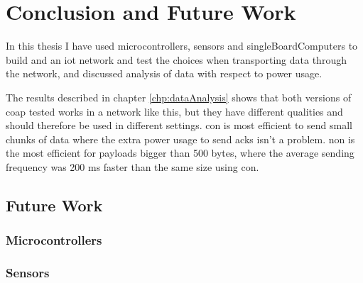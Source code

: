 \chapter{Conclusion and Future Work}
\label{chp:results}



In this thesis I have used \glspl{microcontroller}, sensors and \glspl{singleBoardComputer} to build and an \gls{iot} network and test the choices when transporting data through the network, and discussed analysis of data with respect to power usage. 

The results described in chapter \ref{chp:dataAnalysis} shows that both versions of \gls{coap} tested works in a network like this, but they have different qualities and should therefore be used in different settings. \gls{con} is most efficient to send small chunks of data where the extra power usage to send \glspl{ack} isn't a problem. \gls{non} is the most efficient for payloads bigger than 500 bytes, where the average sending frequency was 200 ms faster than the same size using \gls{con}.  

\section{Future Work}

\subsection{Microcontrollers}

\subsection{Sensors}

